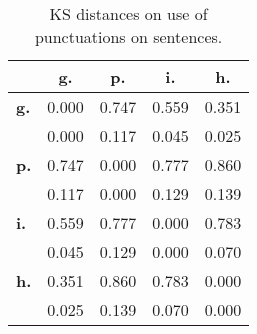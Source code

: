 \begin{table}[h!]
\begin{center}
\begin{tabular}{| l || c | c | c | c |}\hline
 & {\bf g.} & {\bf p.} & {\bf i.} & {\bf h.} \\\hline\hline
{\bf g.} & 0.000 & 0.747 & 0.559 & 0.351 \\
{\bf } & 0.000 & 0.117 & 0.045 & 0.025 \\\hline
{\bf p.} & 0.747 & 0.000 & 0.777 & 0.860 \\
{\bf } & 0.117 & 0.000 & 0.129 & 0.139 \\\hline
{\bf i.} & 0.559 & 0.777 & 0.000 & 0.783 \\
{\bf } & 0.045 & 0.129 & 0.000 & 0.070 \\\hline
{\bf h.} & 0.351 & 0.860 & 0.783 & 0.000 \\
{\bf } & 0.025 & 0.139 & 0.070 & 0.000 \\\hline
\end{tabular}
\caption{KS distances on use of punctuations on sentences.}
\end{center}
\end{table}